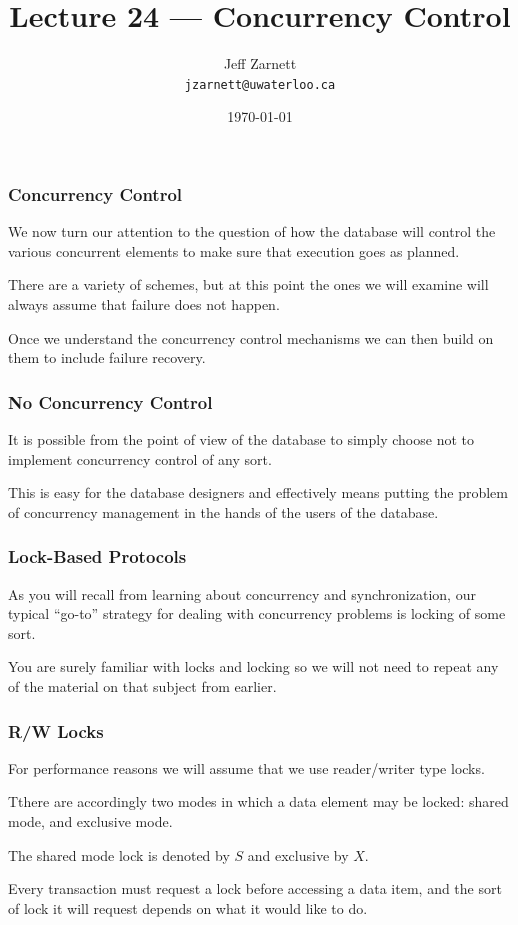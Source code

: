 

\title{Lecture 24 --- Concurrency Control }

\author{Jeff Zarnett \\ \small \texttt{jzarnett@uwaterloo.ca}}
\date{\today}




\begin{frame}
  \titlepage

 \end{frame}


\begin{frame}
\frametitle{Concurrency Control}

We now turn our attention to the question of how the database will control the various concurrent elements to make sure that execution goes as planned. 

There are a variety of schemes, but at this point the ones we will examine will always assume that failure does not happen. 

Once we understand the concurrency control mechanisms we can then build on them to include failure recovery.


\end{frame}

\begin{frame}
\frametitle{No Concurrency Control}

It is possible from the point of view of the database to simply choose not to implement concurrency control of any sort. 

This is easy for the database designers and effectively means putting the problem of concurrency management in the hands of the users of the database.

\end{frame}

\begin{frame}
\frametitle{Lock-Based Protocols}

As you will recall from learning about concurrency and synchronization, our typical ``go-to'' strategy for dealing with concurrency problems is locking of some sort. 

You are surely familiar with locks and locking so we will not need to repeat any of the material on that subject from earlier. 

\end{frame}

\begin{frame}
\frametitle{R/W Locks}

For performance reasons we will assume that we use reader/writer type locks. 

Tthere are accordingly two modes in which a data element may be locked: shared mode, and exclusive mode. 

The shared mode lock is denoted by $S$ and exclusive by $X$. 


Every transaction must request a lock before accessing a data item, and the sort of lock it will request depends on what it would like to do.


\end{frame}

